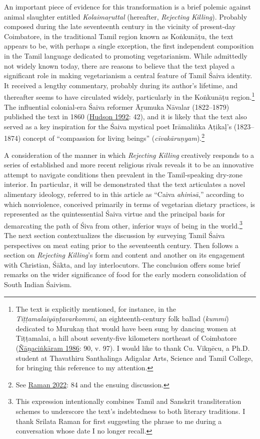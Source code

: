 An important piece of evidence for this transformation is a brief polemic against animal slaughter entitled \emph{{Kolaimaṟuttal}} (hereafter, \emph{Rejecting Killing}). Probably composed during the late seventeenth century in the vicinity of present-day Coimbatore, in the traditional Tamil region known as Koṅkunāṭu, the text appears to be, with perhaps a single exception, the first independent composition in the Tamil language dedicated to promoting vegetarianism. While admittedly not widely known today, there are reasons to believe that the text played a significant role in making vegetarianism a central feature of Tamil Śaiva identity. It received a lengthy commentary, probably during its author’s lifetime, and thereafter seems to have circulated widely, particularly in the Koṅkunāṭu region.\footnote{%
The text is explicitly mentioned, for instance, in the \emph{{Tiṭṭamalaiyāṇṭavarkommi}}, an eighteenth-century folk ballad (\emph{kummi}) dedicated to Murukaṉ that would have been sung by dancing women at Tiṭṭamalai, a hill about seventy-five kilometers northeast of Coimbatore (\hyperref[Nanacinkaram1986]{Ñāṉaciṅkāram 1986}: 90, v. 97). I would like to thank Cu. Vikṉēcu, a Ph.D. student at Thavathiru Santhalinga Adigalar Arts, Science and Tamil College, for bringing this reference to my attention.
}
 The influential colonial-era Śaiva reformer Āṟumuka Nāvalar (1822–1879) published the text in 1860 (\hyperref[Hudson1992]{Hudson 1992}: 42), and it is likely that the text also served as a key inspiration for the Śaiva mystical poet Irāmaliṅka Aṭikaḷ’s (1823–1874) concept of “compassion for living beings” (\emph{cīvakāruṇyam}).\footnote{%
See \hyperref[Raman2022]{Raman 2022}: 84 and the ensuing discussion.
}



A consideration of the manner in which \emph{Rejecting Killing} creatively responds to a series of established and more recent religious rivals reveals it to be an innovative attempt to navigate conditions then prevalent in the Tamil-speaking dry-zone interior. In particular, it will be demonstrated that the text articulates a novel alimentary ideology, referred to in this article as “Caiva \emph{ahiṁsā},” according to which nonviolence, conceived primarily in terms of vegetarian dietary practices, is represented as the quintessential Śaiva virtue and the principal basis for demarcating the path of Śiva from other, inferior ways of being in the world.\footnote{%
This expression intentionally combines Tamil and Sanskrit transliteration schemes to underscore the text’s indebtedness to both literary traditions. I thank Srilata Raman for first suggesting the phrase to me during a conversation whose date I no longer recall. 
}
 The next section contextualizes the discussion by surveying Tamil Śaiva perspectives on meat eating prior to the seventeenth century. Then follows a section on \emph{Rejecting Killing}’s form and content and another on its engagement with Christian, Śākta, and lay interlocutors. The conclusion offers some brief remarks on the wider significance of food for the early modern consolidation of South Indian Śaivism. 

